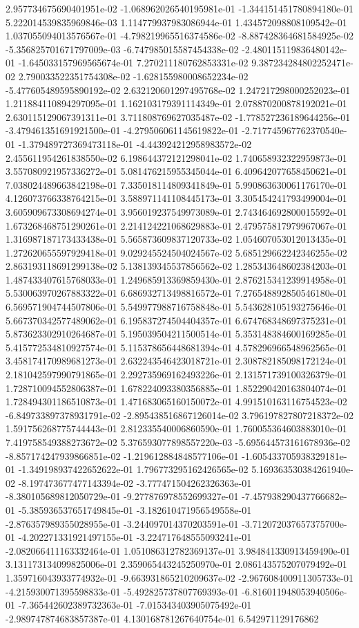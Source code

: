 2.957734675690401951e-02	-1.068962026540195981e-01	-1.344151451780894180e-01	5.222014539835969846e-03	1.114779937983086944e-01	1.434572098808109542e-01	1.037055094013576567e-01	-4.798219965516374586e-02	-8.887428364681584925e-02	-5.356825701671797009e-03	-6.747985015587454338e-02	-2.480115119836480142e-01	-1.645033157969565674e-01	7.270211180762853331e-02	9.387234284802252471e-02	2.790033522351754308e-02	-1.628155980008652234e-02	-5.477605489595890192e-02	2.632120601297495768e-02	1.247217298000252023e-01	1.211884110894297095e-01	1.162103179391114349e-01	2.078870200878192021e-01	2.630115129067391311e-01	3.711808769627035487e-02	-1.778527236189644256e-01	-3.479461351691921500e-01	-4.279506061145619822e-01	-2.717745967762370540e-01	-1.379489727369473118e-01	-4.443924212958983572e-02	2.455611954261838550e-02	6.198644372121298041e-02	1.740658932322959873e-01	3.557080921957336272e-01	5.081476215955345044e-01	6.409642077658450621e-01	7.038024489663842198e-01	7.335018114809341849e-01	5.990863630061176170e-01	4.126073766338764215e-01	3.588971141108445173e-01	3.305454241793499004e-01	3.605909673308694274e-01	3.956019237549973089e-01	2.743464692800015592e-01	1.673268468751290261e-01	2.214124221068629883e-01	2.479575817979967067e-01	1.316987187173433438e-01	5.565873609837120733e-02	1.054607053012013435e-01	1.272620655597929418e-01	9.029245524504024567e-02	5.685129662242346255e-02	2.863193118691299138e-02	5.138139345537856562e-02	1.285343648602384203e-01	1.487433407615768033e-01	1.249685913369859430e-01	2.876215341239914958e-01	5.530063970267883322e-01	6.686932713498816572e-01	7.276548892850546180e-01	6.569571904744507806e-01	5.549977988716758848e-01	5.543628105193275646e-01	5.667370342577489062e-01	6.195837274504404357e-01	6.674768348697375231e-01	5.873623302910264687e-01	5.195039504211500514e-01	5.353148384600169285e-01	5.415772534810927574e-01	5.115378656448681394e-01	4.578296966548962565e-01	3.458174170989681273e-01	2.632243546423018721e-01	2.308782185098172124e-01	2.181042597990791865e-01	2.292735969162493226e-01	2.131571739100326379e-01	1.728710094552806387e-01	1.678224093380356885e-01	1.852290420163804074e-01	1.728494301186510873e-01	1.471683065160150072e-01	4.991510163116754523e-02	-6.849733897378931791e-02	-2.895438516867126014e-02	3.796197827807218372e-02	1.591756268775744443e-01	2.812335540006860590e-01	1.760055364603883010e-01	7.419758549388273672e-02	5.376593077898557220e-03	-5.695644573161678936e-02	-8.857174247939866851e-02	-1.219612884848577106e-01	-1.605433705938329181e-01	-1.349198937422652622e-01	1.796773295162426565e-02	5.169363530384261940e-02	-8.197473677477143394e-02	-3.777471504262326363e-01	-8.380105689812050729e-01	-9.277876978552699327e-01	-7.457938290437766682e-01	-5.385936537651749845e-01	-3.182610471956549558e-01	-2.876357989355028955e-01	-3.244097014370203591e-01	-3.712072037657375700e-01	-4.202271331921497155e-01	-3.224717648555093241e-01	-2.082066411163332464e-01	1.051086312782369137e-01	3.984841330913459490e-01	3.131173134099825006e-01	2.359065443245250970e-01	2.086143575207079492e-01	1.359716043933774932e-01	-9.663931865210209637e-02	-2.967608400911305733e-01	-4.215930071395598833e-01	-5.492825737807769393e-01	-6.816011948053940506e-01	-7.365442602389732363e-01	-7.015343403905075492e-01	-2.989747874683857387e-01	4.130168781267640754e-01	6.542971129176862